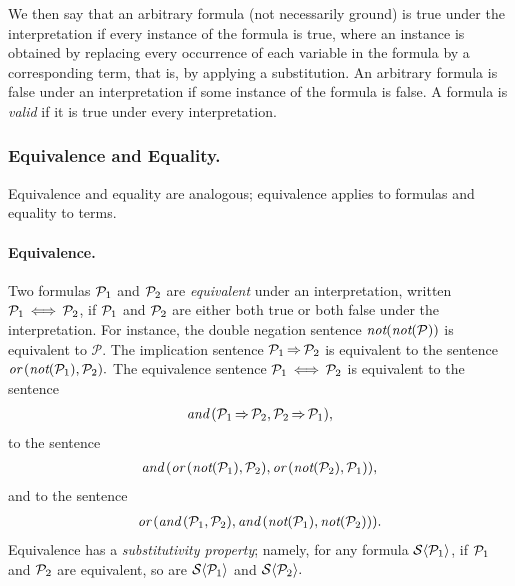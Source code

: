 \documentclass[runningheads]{llncs}
\DeclareMathOperator{\uand}{\emph{and}\,}
\DeclareMathOperator{\uor}{\emph{or}\,}
\DeclareMathOperator{\unot}{\emph{not}\kern-.0pt}
\DeclareMathOperator{\uimplies}{\Rightarrow}
\DeclareMathOperator{\uiff}{\iff}
\begin{document}
   We then say that an arbitrary formula (not necessarily ground) is true under the interpretation if every instance of the formula is true, where an instance is obtained by replacing every occurrence of each variable in the formula by a corresponding term, that is, by applying a substitution. An arbitrary formula is false under an interpretation if some instance of the formula is false.   A formula is \emph{valid} if it is true under every interpretation. 
   
   \subsubsection{Equivalence and Equality.}
   Equivalence and equality are analogous; equivalence applies to formulas and equality to terms.
   
   \paragraph{Equivalence.}
   Two formulas ${\mathcal{P}}_{1}$ and ${\mathcal{P}}_{2}$ are \emph{equivalent} under an interpretation, written $\expsub{\mathcal{P}}{1} \uiff \expsub{\mathcal{P}}{2}$, if  ${\mathcal{P}}_{1}$ and ${\mathcal{P}}_{2}$ are either both true or both false under the interpretation.  
   For instance, the double negation sentence $\unot(\unot(\mathcal{P}))$ is equivalent to $\mathcal{P}.$
   The implication sentence $\expsub{\mathcal{P}}{1} \uimplies  \expsub{\mathcal{P}}{2}$  is equivalent to the sentence $ \uor(\unot(\expsub{\mathcal{P}}{1}), \expsub{\mathcal{P}}{2}).$ 
   The equivalence sentence $\expsub{\mathcal{P}}{1} \uiff \expsub{\mathcal{P}}{2}$ is equivalent to the sentence
   \begin{align*}
   \uand (\expsub{\mathcal{P}}{1} \uimplies  \expsub{\mathcal{P}}{2},\expsub{\mathcal{P}}{2} \uimplies  \expsub{\mathcal{P}}{1}),
   \end{align*}
   to the sentence
   \begin{align*}
   \uand (\uor(\unot(\expsub{\mathcal{P}}{1}),  \expsub{\mathcal{P}}{2}),\uor(\unot(\expsub{\mathcal{P}}{2}), \expsub{\mathcal{P}}{1})),
   \end{align*}
   and to the sentence
   \begin{align*}
   \uor (\uand(\expsub{\mathcal{P}}{1},  \expsub{\mathcal{P}}{2}), 
   \uand(\unot (\expsub{\mathcal{P}}{1}), \unot (\expsub{\mathcal{P}}{2}))).
  \end{align*} 
    Equivalence has a \emph{substitutivity property}; namely, for any formula $\mathcal{S}\langle{\mathcal{P}}_{1}\rangle$, if ${\mathcal{P}}_{1}$ and ${\mathcal{P}}_{2}$ are equivalent, so are $\mathcal{S}\langle{\mathcal{P}}_{1}\rangle$ and $\mathcal{S}\langle {\mathcal{P}}_{2}\rangle.$ 
\end{document}
